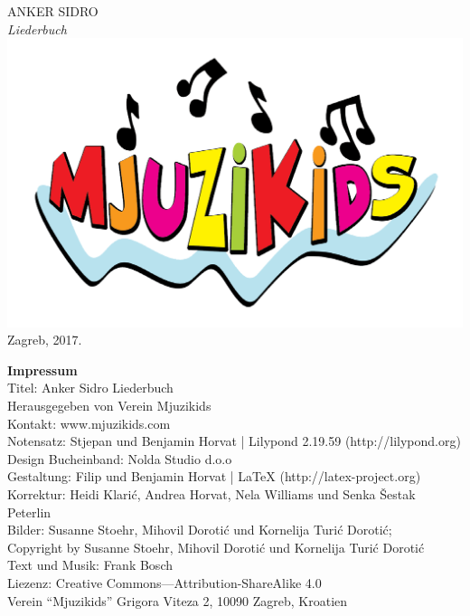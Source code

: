 \documentclass[a4paper,twoside, svgnames]{article}
\newcommand{\impresspac}{7pt}
\newcommand*{\titleTH}{\begingroup
\vspace*{5cm}
\begin{center}
{{\fontsize{50}{60}\selectfont
\textsf{\textcolor{anker}{ANKER} \textcolor{sidro}{SIDRO}}}}\\
\vspace*{0.3cm}
{\fontsize{69}{80}\selectfont
\itshape\textrm{Liederbuch}}
\vfill %
\includegraphics[width=0.2\linewidth]{images/mjuzikids_logo}\\
\vspace*{0.5cm}
{Zagreb, 2017.}\par %
\end{center}
\endgroup}
\begin{document}
\thispagestyle {empty}
\titleTH

\newpage
\thispagestyle {empty}
\begin{center}
\vspace*{\fill}
\begin{onehalfspacing}
\textbf{\textsf{Impressum}}\\
\vspace{10pt}
Titel: Anker Sidro Liederbuch\\
\vspace{\impresspac}
Herausgegeben von Verein Mjuzikids\\
\vspace{\impresspac}
Kontakt: www.mjuzikids.com\\
\vspace{\impresspac}
Notensatz: Stjepan und Benjamin Horvat | Lilypond 2.19.59 (http://lilypond.org)\\
\vspace{\impresspac}
Design Bucheinband: Nolda Studio d.o.o\\
\vspace{\impresspac}
Gestaltung: Filip und Benjamin Horvat | LaTeX (http://latex-project.org) \\
\vspace{\impresspac}
Korrektur: Heidi Klarić, Andrea Horvat, Nela Williams und Senka Šestak Peterlin\\
\vspace{\impresspac}
Bilder: Susanne Stoehr, Mihovil Dorotić und Kornelija Turić Dorotić;\\
Copyright by Susanne Stoehr, Mihovil Dorotić und Kornelija Turić Dorotić\\
\vspace{\impresspac}
Text und Musik: Frank Bosch\\
\vspace{\impresspac}
Liezenz: Creative Commons—Attribution-ShareAlike 4.0\\
\vspace{\impresspac}
Verein “Mjuzikids” Grigora Viteza 2, 10090 Zagreb, Kroatien\\
\vspace{\impresspac}
\vspace{\impresspac}

\end{onehalfspacing}
\end{center}
\end{document}
